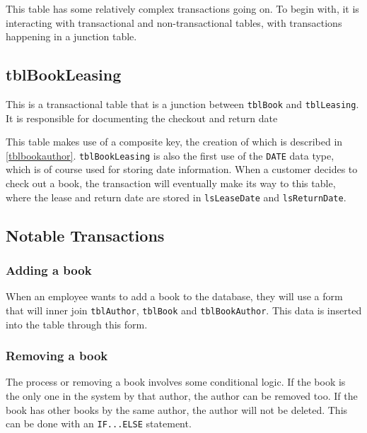 \documentclass[11pt,a4paper]{scrartcl}
\begin{document}
	This table has some relatively complex transactions going on. To begin with, it is interacting with transactional and non-transactional tables, with transactions happening in a junction table.
	
	\subsection{tblBookLeasing}\label{tblbookleasing}
	
	This is a transactional table that is a junction between \texttt{tblBook} and \texttt{tblLeasing}. It is responsible for documenting the checkout and return date 
	
	
	
	This table makes use of a composite key, the creation of which is described in \ref{tblbookauthor}. \texttt{tblBookLeasing} is also the first use of the \texttt{DATE} data type, which is of course used for storing date information. When a customer decides to check out a book, the transaction will eventually make its way to this table, where the lease and return date are stored in \texttt{lsLeaseDate} and \texttt{lsReturnDate}.
	
	\subsection{Notable Transactions}\label{notabletransactions}
	
	\subsubsection*{Adding a book}
	
	When an employee wants to add a book to the database, they will use a form that will inner join \texttt{tblAuthor}, \texttt{tblBook} and \texttt{tblBookAuthor}. This data is inserted into the table through this form.
	
	\subsubsection*{Removing a book}
	
	The process or removing a book involves some conditional logic. If the book is the only one in the system by that author, the author can be removed too. If the book has other books by the same author, the author will not be deleted. This can be done with an \texttt{IF...ELSE} statement.
		
\end{document}
